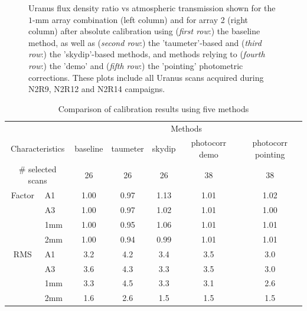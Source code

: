 \begin{figure}[ht!]
\begin{center}
  \caption[Uranus flux density stability against atmospheric
    transmission]{Uranus flux density ratio vs atmospheric transmission
    shown for the $1$-mm array
    combination (left column) and for array 2 (right column) after absolute
    calibration using (\emph{first row}:) the baseline method, as
    well as (\emph{second row}:) the 'taumeter'-based and
    (\emph{third row}:) the 'skydip'-based methods, and methods
    relying to (\emph{fourth row}:) the 'demo' and (\emph{fifth
      row}:) the 'pointing' photometric corrections. These plots
    include all Uranus scans acquired during N2R9, N2R12 and N2R14
    campaigns. }
  \label{fig:calib_uranus_vs_atmtrans_all}
\end{center}
\end{figure}



\begin{table}[th]
\begin{center}
\begin{tabular}{|c|l|c|c|c|c|c|}
  \hline
  \multicolumn{2}{|c|}{}  &  \multicolumn{5}{|c|}{Methods} \\\cline{3-7}
  \multicolumn{2}{|c|}{Characteristics} &  baseline  & taumeter  &  skydip  &  photocorr demo & photocorr pointing \\
  \hline\hline
   \multicolumn{2}{|c|}{$\#$ selected scans} & 26    &       26  &    26    &    38           &    38 \\ 
  \hline 
  Factor &  A1          &   1.00  &  0.97   &  1.13    &   1.01    &   1.02  \\
       &  A3            &   1.00  &  0.97   &  1.02    &   1.01    &   1.00  \\
       &  1mm           &   1.00  &  0.95   &  1.06    &   1.01    &   1.01  \\
       &  2mm           &   1.00  &  0.94   &  0.99    &   1.01    &   1.01  \\
  \hline
  RMS  &  A1            &  3.2    &   4.2   &   3.4    &    3.5    &   3.0 \\
       &  A3            &  3.6    &   4.3   &   3.3    &    3.5    &   3.0 \\
       &  1mm           &  3.3    &   4.5   &   3.3    &    3.1    &   2.6 \\
       &  2mm           &  1.6    &   2.6   &   1.5    &    1.5    &   1.5 \\
\hline\hline
\end{tabular}
\caption[Comparison of calibration results using five methods]{Comparison of calibration results using five methods}
\label{tab:Abs_calibration_results_all}
\end{center}
\end{table}





